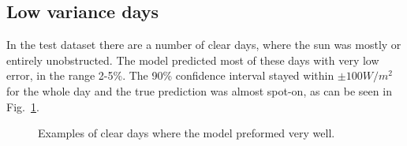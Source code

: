\subsection{Low variance days}
In the test dataset there are a number of clear days, where the sun was mostly or entirely unobstructed. The model predicted most of these days with very low error, in the range 2-5\%. The 90\% confidence interval stayed within $\pm100 W/m^2$ for the whole day and the true prediction was almost spot-on, as can be seen in Fig.~\ref{fig:full_low_best}.
\begin{figure}[ht!]
    \centering
    \qquad
    \qquad
    \caption{Examples of clear days where the model preformed very well.
    \label{fig:full_low_best}}
\end{figure}


